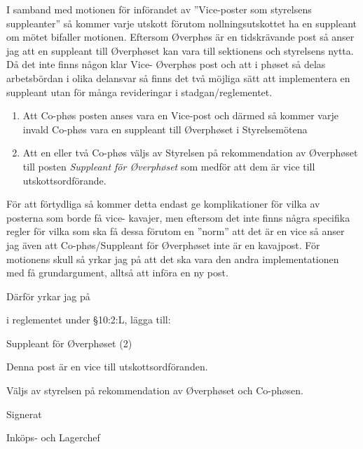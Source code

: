 \documentclass[../_main/handlingar.tex]{subfiles}
\begin{document}
I samband med motionen för införandet av ”Vice-poster som styrelsens suppleanter” så kommer
varje utskott förutom nollningsutskottet ha en suppleant om mötet bifaller motionen. Eftersom
Øverphøs är en tidskrävande post så anser jag att en suppleant till Øverphøset kan vara till
sektionens och styrelsens nytta. Då det inte finns någon klar Vice- Øverphøs post och att i phøset så
delas arbetsbördan i olika delansvar så finns det två möjliga sätt att implementera en suppleant utan
för många revideringar i stadgan/reglementet.

\begin{enumerate}
\item Att Co-phøs posten anses vara en Vice-post och därmed så kommer varje invald Co-phøs
vara en suppleant till Øverphøset i Styrelsemötena
\item Att en eller två Co-phøs väljs av Styrelsen på rekommendation av Øverphøset till posten
\textit{Suppleant för Øverphøset} som medför att dem är vice till utskottsordförande.
\end{enumerate}

För att förtydliga så kommer detta endast ge komplikationer för vilka av posterna som borde få vice-
kavajer, men eftersom det inte finns några specifika regler för vilka som ska få dessa förutom en
”norm” att det är en vice så anser jag även att Co-phøs/Suppleant för Øverphøset inte är en
kavajpost. För motionens skull så yrkar jag på att det ska vara den andra implementationen med få
grundargument, alltså att införa en ny post.

Därför yrkar jag på

\begin{attsatser}
\att i reglementet under \S10:2:L, lägga till:\par
\begin{emptylist}
    \item Suppleant för Øverphøset (2)
      \begin{dashlist}
        \item Denna post är en vice till utskottsordföranden.
        \item Väljs av styrelsen på rekommendation av Øverphøset och Co-phøsen.
      \end{dashlist}
    \end{emptylist}
\end{attsatser}
\begin{signatures}{1}
    Signerat
    \signature{Jonathan Benitez}{Inköps- och Lagerchef}
\end{signatures}
\end{document}
